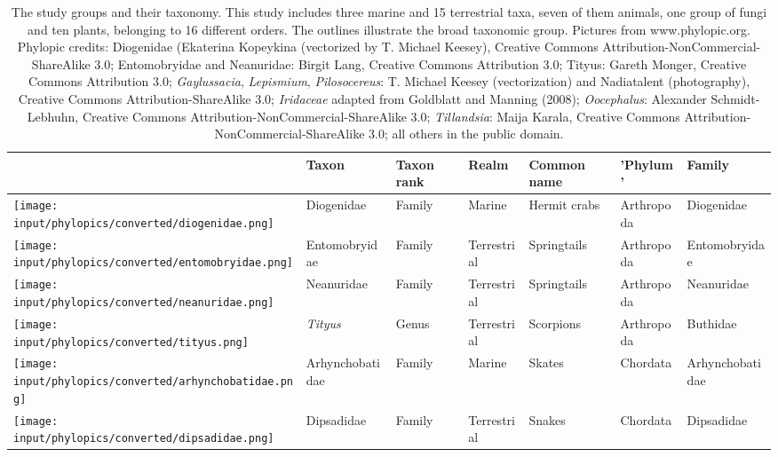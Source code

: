 \documentclass[fleqn,10pt,lineno]{wlpeerj} %
\begin{document}
\begin{table}
\caption{\label{tab:tabletaxa}The study groups and their taxonomy. This study includes three marine and 15 terrestrial taxa, seven of them animals, one group of fungi and ten plants, belonging to 16 different orders. The outlines illustrate the broad taxonomic group. Pictures from www.phylopic.org. Phylopic credits: Diogenidae (Ekaterina Kopeykina (vectorized by T. Michael Keesey), Creative Commons Attribution-NonCommercial-ShareAlike 3.0; Entomobryidae and Neanuridae: Birgit Lang, Creative Commons Attribution 3.0; Tityus: Gareth Monger, Creative Commons Attribution 3.0; \textit{Gaylussacia}, \textit{Lepismium}, \textit{Pilosocereus}: T. Michael Keesey (vectorization) and Nadiatalent (photography), Creative Commons Attribution-ShareAlike 3.0; \textit{Iridaceae} adapted from Goldblatt and Manning (2008); \textit{Oocephalus}: Alexander Schmidt-Lebhuhn, Creative Commons Attribution-NonCommercial-ShareAlike 3.0; \textit{Tillandsia}: Maija Karala, Creative Commons Attribution-NonCommercial-ShareAlike 3.0; all others in the public domain.}
\centering
\fontsize{11}{13}\selectfont
\begin{tabular}[t]{>{\raggedright\arraybackslash}p{1cm}>{\raggedright\arraybackslash}p{2.5cm}>{\raggedright\arraybackslash}p{1.5cm}>{\raggedright\arraybackslash}p{2cm}>{\raggedright\arraybackslash}p{2cm}>{\raggedright\arraybackslash}p{2cm}>{\raggedright\arraybackslash}p{3cm}}
\toprule
 & Taxon & Taxon rank & Realm & Common name & 'Phylum' & Family\\
\midrule
\texttt{[image: input/phylopics/converted/diogenidae.png]} & Diogenidae & Family & Marine & Hermit crabs & Arthropoda & Diogenidae\\
\texttt{[image: input/phylopics/converted/entomobryidae.png]} & Entomobryidae & Family & Terrestrial & Springtails & Arthropoda & Entomobryidae\\
\texttt{[image: input/phylopics/converted/neanuridae.png]} & Neanuridae & Family & Terrestrial & Springtails & Arthropoda & Neanuridae\\
\texttt{[image: input/phylopics/converted/tityus.png]} & \em{Tityus} & Genus & Terrestrial & Scorpions & Arthropoda & Buthidae\\
\texttt{[image: input/phylopics/converted/arhynchobatidae.png]} & Arhynchobatidae & Family & Marine & Skates & Chordata & Arhynchobatidae\\
\addlinespace
\texttt{[image: input/phylopics/converted/dipsadidae.png]} & Dipsadidae & Family & Terrestrial & Snakes & Chordata & Dipsadidae\\

\end{tabular}
\end{table}
\end{document}
